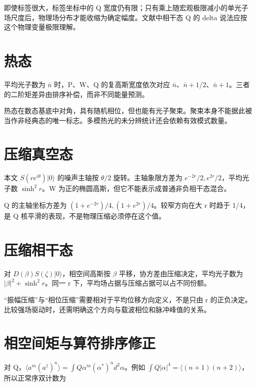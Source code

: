 \documentclass[UTF8,a4paper,zihao=-4,openany,fontset=fandol]{ctexbook}
\begin{document}
即使标签很大，标签坐标中的 Q 宽度仍有限；只有乘上随宏观极限减小的单光子场尺度后，物理场分布才能收缩为确定幅度。文献中相干态 Q 的 delta 说法应按这个物理变量极限理解。



\section{热态}\label{sec:D:3}


平均光子数为 $\bar n$ 时，P、W、Q 的复高斯宽度依次对应 $\bar n$、$\bar n+1/2$、$\bar n+1$。三者的二阶矩差异由排序补偿，而非不同能量预测。



热态在数态基底中对角，具有随机相位，但也能有光子聚束。聚束本身不能据此被当作非经典态的唯一标志。多模热光的未分辨统计还会依赖有效模式数量。



\section{压缩真空态}\label{sec:D:4}


本文 $S(re^{i\theta})|0\rangle$ 的噪声主轴按 $\theta/2$ 旋转。主轴象限方差为 $e^{-2r}/2,e^{2r}/2$，平均光子数 $\sinh^2r$。W 为正的椭圆高斯，但它不能表示成普通非负相干态混合。



Q 的主轴坐标方差为 $(1+e^{-2r})/4,(1+e^{2r})/4$。较窄方向在大 r 时趋于 1/4，是 Q 核平滑的表现，不是物理压缩必须停在这个值。



\section{压缩相干态}\label{sec:D:5}


对 $D(\beta)S(\zeta)|0\rangle$，相空间高斯按 $\beta$ 平移，协方差由压缩决定，平均光子数为 $|\beta|^2+\sinh^2r$。同一 r 下，平均场占据与压缩占据可以占不同份额。



“振幅压缩”与“相位压缩”需要相对于平均位移方向定义，不是只由 r 的正负决定。比较强场驱动时，还需明确这个方向与载波相位和脉冲峰值的关系。



\section{相空间矩与算符排序修正}\label{sec:D:6}


对 Q，$\langle a^m(a^\dagger)^n\rangle=\int Q\alpha^m(\alpha^*)^nd^2\alpha$。例如 $\int Q|\alpha|^4=\langle(n+1)(n+2)\rangle$，所以正常序双计数为
\end{document}
